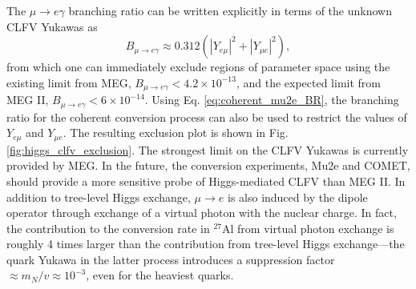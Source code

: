 \documentclass{book}[letterpaper,12pt]
\begin{document}
The $\mu\rightarrow e\gamma$ branching ratio can be written explicitly in terms of the unknown CLFV Yukawas as
\begin{equation}
B_{\mu\rightarrow e\gamma}\approx 0.312\left(|Y_{e\mu}|^2+|Y_{\mu e}|^2\right),
\end{equation}
from which one can immediately exclude regions of parameter space using the existing limit from MEG, $B_{\mu\rightarrow e\gamma}<4.2\times 10^{-13}$, and the expected limit from MEG II, $B_{\mu\rightarrow e\gamma}<6\times 10^{-14}$. Using Eq. \ref{eq:coherent_mu2e_BR}, the branching ratio for the coherent conversion process can also be used to restrict the values of $Y_{e\mu}$ and $Y_{\mu e}$. The resulting exclusion plot is shown in Fig. \ref{fig:higgs_clfv_exclusion}. The strongest limit on the CLFV Yukawas is currently provided by MEG. In the future, the conversion experiments, Mu2e and COMET, should provide a more sensitive probe of Higgs-mediated CLFV than MEG II. In addition to tree-level Higgs exchange, $\mu\rightarrow e$ is also induced by the dipole operator through exchange of a virtual photon with the nuclear charge. In fact, the contribution to the conversion rate in $^{27}$Al from virtual photon exchange is roughly 4 times larger than the contribution from tree-level Higgs exchange---the quark Yukawa in the latter process introduces a suppression factor $\approx m_N/v\approx 10^{-3}$, even for the heaviest quarks. 
\end{document}
